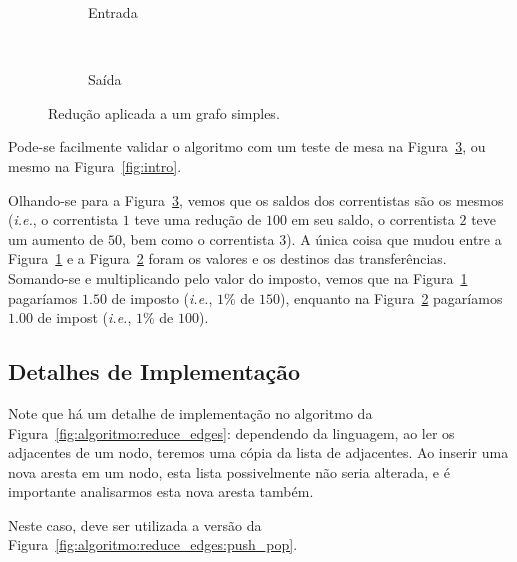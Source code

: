 \documentclass[12pt]{article}
\begin{document}
\begin{figure}[H]
  \centering
  \begin{subfigure}[b]{0.5\textwidth}
    \begin{dot2tex}[neato,options=-tmath]
        
    \end{dot2tex}
    \caption{Entrada}
    \label{fig:reduce:abc:entrada}
  \end{subfigure}%
  ~
  \begin{subfigure}[b]{0.5\textwidth}
    \begin{dot2tex}[neato,options=-tmath]
        
    \end{dot2tex}
    \caption{Saída}
    \label{fig:reduce:abc:saida}
  \end{subfigure}
  \caption{Redução aplicada a um grafo simples.}
  \label{fig:reduce:abc}
\end{figure}

Pode-se facilmente validar o algoritmo com um teste de mesa na
Figura~\ref{fig:reduce:abc}, ou mesmo na Figura~\ref{fig:intro}.

Olhando-se para a Figura~\ref{fig:reduce:abc}, vemos que os saldos dos
correntistas são os mesmos (\textit{i.e.}, o correntista $1$ teve uma redução de
$100$ em seu saldo, o correntista $2$ teve um aumento de $50$, bem como o
correntista $3$). A única coisa que mudou entre a
Figura~\ref{fig:reduce:abc:entrada} e a Figura~\ref{fig:reduce:abc:saida} foram
os valores e os destinos das transferências. Somando-se e multiplicando pelo
valor do imposto, vemos que na Figura~\ref{fig:reduce:abc:entrada} pagaríamos
$1.50$ de imposto (\textit{i.e.}, $1\%$ de $150$), enquanto na
Figura~\ref{fig:reduce:abc:saida} pagaríamos $1.00$ de impost (\textit{i.e.},
$1\%$ de $100$).


\subsection{Detalhes de Implementação}

Note que há um detalhe de implementação no algoritmo da
Figura~\ref{fig:algoritmo:reduce_edges}: dependendo da linguagem, ao ler os
adjacentes de um nodo, teremos uma cópia da lista de adjacentes. Ao inserir uma
nova aresta em um nodo, esta lista possivelmente não seria alterada, e é
importante analisarmos esta nova aresta também.

Neste caso, deve ser utilizada a versão da Figura~\ref{fig:algoritmo:reduce_edges:push_pop}.
\end{document}
